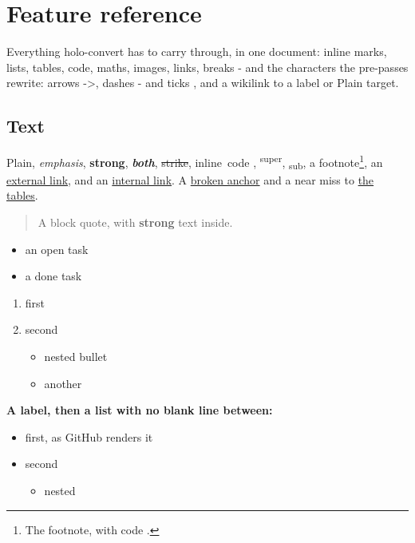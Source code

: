 \documentclass[
]{article}
\author{}
\date{}
\providecommand{\tightlist}{%
  \setlength{\itemsep}{0pt}\setlength{\parskip}{0pt}}
\renewcommand{\texttt}[1]{%
  \colorbox{termbg}{{\ttfamily\relsize{-1}\color{termfg}#1}}%
}
\begin{document}
\section{Feature reference}\label{feature-reference}

Everything holo-convert has to carry through, in one document: inline
marks, lists, tables, code, maths, images, links, breaks - and the
characters the pre-passes rewrite: arrows -\textgreater, dashes - and
ticks , and a wikilink to a label or Plain target.

\subsection{Text}\label{text}

Plain, \emph{emphasis}, \textbf{strong}, \textbf{\emph{both}},
\st{strike}, \texttt{inline\ code}, \textsuperscript{super},
\textsubscript{sub}, a footnote\footnote{The footnote, with
  \texttt{code}.}, an \href{https://example.org}{external link}, and an
\hyperref[tables]{internal link}. A \hyperref[nowhere-at-all]{broken
anchor} and a near miss to \hyperref[tabels]{the tables}.

\begin{quote}
A block quote, with \textbf{strong} text inside.
\end{quote}

\begin{itemize}
\tightlist
\item[$\square$]
  an open task
\item[$\boxtimes$]
  a done task
\end{itemize}

\begin{enumerate}
\def\labelenumi{\arabic{enumi}.}
\tightlist
\item
  first
\item
  second

  \begin{itemize}
  \tightlist
  \item
    nested bullet
  \item
    another
  \end{itemize}
\end{enumerate}

\textbf{A label, then a list with no blank line between:}

\begin{itemize}
\tightlist
\item
  first, as GitHub renders it
\item
  second

  \begin{itemize}
  \tightlist
  \item
    nested
  \end{itemize}
\end{itemize}
\end{document}

